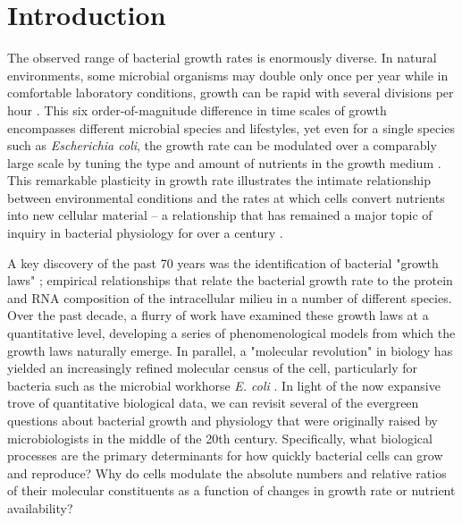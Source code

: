 \section{Introduction}
The observed range of bacterial growth rates is enormously diverse. In
natural environments, some microbial organisms may double only once per
year \citep{mikucki2009} while in comfortable laboratory conditions, growth
can be rapid with several divisions per hour \citep{schaechter1958}. This six
order-of-magnitude difference in time scales of growth encompasses different microbial
species and lifestyles, yet even for a single species such as \textit{Escherichia
coli}, the growth rate can be modulated over a comparably large scale by tuning the
type and amount of nutrients in the growth medium \citep{liu2005a}. This remarkable
plasticity in growth rate illustrates the intimate relationship between
environmental conditions and the rates at which cells convert nutrients into
new cellular material -- a relationship that has remained a major topic of
inquiry in bacterial physiology for over a century \citep{jun2018}.


A key discovery of the past 70 years was the identification of
bacterial "growth laws" \citep{schaechter1958}; empirical relationships that
relate the bacterial growth rate to the protein and RNA composition of the
intracellular milieu in a number of different species. Over the past decade, a
flurry of work \citep{molenaar2009, scott2010, klumpp2014, basan2015, dai2016,
erickson2017} have examined these growth laws at a quantitative level,
developing a series of phenomenological models from which the growth laws
naturally emerge. In parallel, a "molecular revolution" in biology has yielded
an increasingly refined molecular census of the cell, particularly for bacteria
such as the microbial workhorse \textit{E. coli} \citep{schmidt2016,
davidi2016a}. In light of the now expansive trove of quantitative biological data,
we can revisit several of the evergreen questions about bacterial growth and physiology that
were originally raised by microbiologists in the middle of the 20th century.
Specifically, what biological processes are the primary determinants for how
quickly bacterial cells can grow and reproduce? Why do cells modulate the
absolute numbers and relative ratios of their molecular constituents as a
function of changes in growth rate or nutrient availability?

